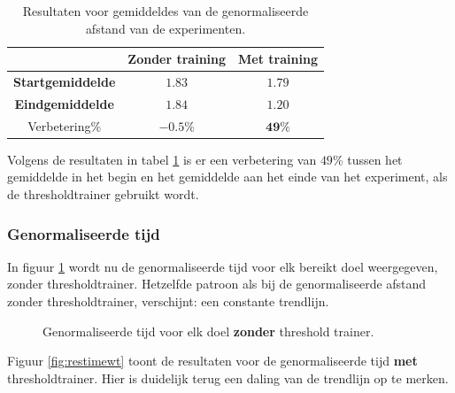 \documentclass{article}
\newcommand{\figwidth}{0.82\linewidth}
\begin{document}
\begin{table}[H]
	\begin{tabular}{|c|c|c|}
		\hline  & \textbf{Zonder training} & \textbf{Met training} \\ 
		\hline \textbf{Startgemiddelde} & $1.83$ & $1.79$ \\ 
		\hline \textbf{Eindgemiddelde} & $1.84$ & $1.20$ \\ 
		\hline Verbetering\% & $\mathbf{-0.5}\%$ & $\mathbf{49}\%$\\
		\hline
	\end{tabular} 
	\caption{Resultaten voor gemiddeldes van de genormaliseerde afstand van de experimenten.}
	\label{tbl:resgemiddeldesdist}
\end{table}
Volgens de resultaten in tabel \ref{tbl:resgemiddeldesdist} is er een verbetering van $49$\% tussen het gemiddelde in het begin en het gemiddelde aan het einde van het experiment, als de thresholdtrainer gebruikt wordt.
\subsubsection*{Genormaliseerde tijd}
In figuur \ref{fig:restiment} wordt nu de genormaliseerde tijd voor elk bereikt doel weergegeven, zonder thresholdtrainer. Hetzelfde patroon als bij de genormaliseerde afstand zonder thresholdtrainer, verschijnt: een constante trendlijn.

\begin{figure}[H]
	\centering
	\caption{Genormaliseerde tijd voor elk doel \textbf{zonder} threshold trainer.}
	\label{fig:restiment}
	
\end{figure}
Figuur \ref{fig:restimewt} toont de resultaten voor de genormaliseerde tijd \textbf{met} thresholdtrainer. Hier is duidelijk terug een daling van de trendlijn op te merken.
\end{document}
